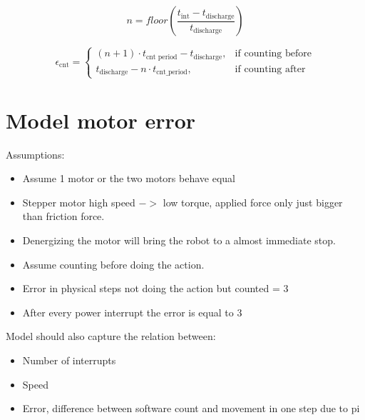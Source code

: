 \documentclass[11pt,twoside,a4paper]{article}
\begin{document}
\begin{equation}
n = floor(\frac{t_{\text{int}} - t_{\text{discharge}}}{t_{\text{discharge}}})
\end{equation}

\begin{equation}
\epsilon_{\text{cnt}} =
    \begin{cases}
      (n+1)\cdot{}t_{\text{cnt period}} - t_{\text{discharge}}, & \text{if } \text{counting before} \\
      t_{\text{discharge}} - n\cdot{}t_{\text{cnt\_period}}, & \text{if } \text{counting after}
    \end{cases}
\end{equation}

\newpage

\section{Model motor error}

Assumptions: \\
\begin{itemize}
\item Assume 1 motor or the two motors behave equal
\item Stepper motor high speed $->$ low torque, applied force only just bigger than friction force.
\item Denergizing the motor will bring the robot to a almost immediate stop.
\item Assume counting before doing the action.
\item Error in physical steps not doing the action but counted = 3
\item After every power interrupt the error is equal to 3
\end{itemize}


Model should also capture the relation between: \\
\begin{itemize}
\item Number of interrupts
\item Speed
\item Error, difference between software count and movement in one step due to pi
\end{itemize}
\end{document}
